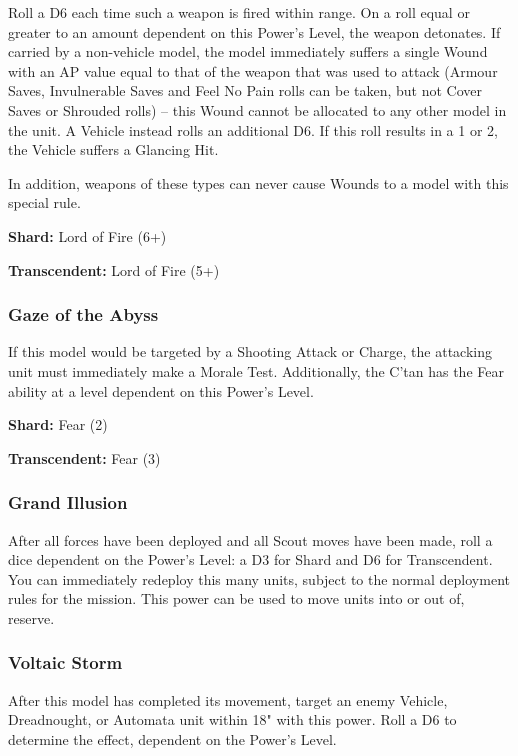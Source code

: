 Roll a D6 each time such a weapon is fired within range. On a roll equal or greater to an amount dependent on this Power's Level, the weapon detonates. If carried by a non-vehicle model, the model immediately suffers a single Wound with an AP value equal to that of the weapon that was used to attack (Armour Saves, Invulnerable Saves and Feel No Pain rolls can be taken, but not Cover Saves or Shrouded rolls) – this Wound cannot be allocated to any other model in the unit. A Vehicle instead rolls an additional D6. If this roll results in a 1 or 2, the Vehicle suffers a Glancing Hit.

In addition, weapons of these types can never cause Wounds to a model with this special rule.

\textbf{Shard:} Lord of Fire (6+)

\textbf{Transcendent:} Lord of Fire (5+)


\subsubsection{Gaze of the Abyss} \label{Gaze of the Abyss}

If this model would be targeted by a Shooting Attack or Charge, the attacking unit must immediately make a Morale Test. Additionally, the C'tan has the Fear ability at a level dependent on this Power's Level.

\textbf{Shard:} Fear (2)

\textbf{Transcendent:} Fear (3)


\subsubsection{Grand Illusion} \label{Grand Illusion}

After all forces have been deployed and all Scout moves have been made, roll a dice dependent on the Power's Level: a D3 for Shard and D6 for Transcendent. You can immediately redeploy this many units, subject to the normal deployment rules for the mission. This power can be used to move units into or out of, reserve.


\subsubsection{Voltaic Storm} \label{Voltaic Storm}

After this model has completed its movement, target an enemy Vehicle, Dreadnought, or Automata unit within 18" with this power. Roll a D6 to determine the effect, dependent on the Power's Level.


